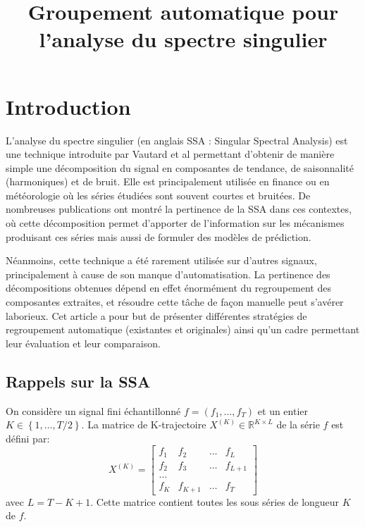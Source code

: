 \documentclass{gretsi}
\title{Groupement automatique pour l'analyse du spectre singulier}
\affil{2}{L2TI - Université Paris 13 \\
         99 Avenue Jean Baptiste Clément, 93430 Villetaneuse}}
\newcommand{\R}{\mathbb R}
\newcommand{\val}[3]{(#1_1 #3 \dots #3 #1_#2)}
\begin{document}
\maketitle


\section{Introduction}
\label{sec:intro}

L'analyse du spectre singulier (en anglais SSA : Singular Spectral Analysis) est une technique introduite par Vautard et al \cite{vautard_89_SSA} permettant d'obtenir de manière simple une décomposition du signal en composantes de tendance, de saisonnalité (harmoniques) et de bruit.
Elle est principalement utilisée en finance ou en météorologie où les séries étudiées sont souvent courtes et bruitées.
De nombreuses publications ont montré la pertinence de la SSA dans ces contextes, où cette décomposition permet d'apporter de l'information sur les mécanismes produisant ces séries mais aussi de formuler des modèles de prédiction.


Néanmoins, cette technique a été rarement utilisée sur d'autres signaux, principalement à cause de son manque d'automatisation.
La pertinence des décompositions obtenues dépend en effet énormément du regroupement des composantes extraites, et résoudre cette tâche de façon manuelle peut s'avérer laborieux.
Cet article a pour but de présenter différentes stratégies de regroupement automatique (existantes et originales) ainsi qu'un cadre permettant leur évaluation et leur comparaison.



\subsection{Rappels sur la SSA}
\label{sub:rap}
On considère un signal fini échantillonné $f = \val{f}{T}{,}$ et un entier $K \in \left \{ 1, \dots, T/2 \right \}$.
La matrice de K-trajectoire $X^{(K)} \in \R^{K\times L}$ de la série $f$ est défini par:
\begin{equation*} 
    X^{(K)} =
    \begin{bmatrix}
	    f_1 & f_2 &\dots & f_L\\
	    f_2 & f_3 &\dots & f_{L+1}\\
	    \dots\\
	    f_{K} & f_{K+1} &\dots & f_T
    \end{bmatrix}
\end{equation*}
avec $L = T-K+1$.
Cette matrice contient toutes les sous séries de longueur $K$ de $f$.
\end{document}
